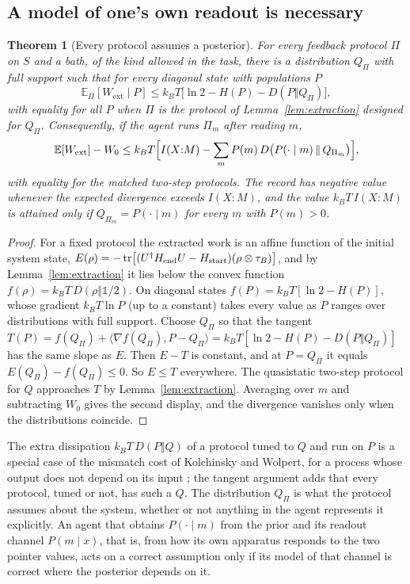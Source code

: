 \documentclass[12pt]{article}
\newtheorem{theorem}{Theorem}
\begin{document}
\subsection{A model of one's own readout is necessary}

\begin{theorem}[Every protocol assumes a posterior]
\label{thm:selfmodel}
For every feedback protocol $\Pi$ on $S$ and a bath, of the kind allowed in the task, there is a distribution $Q_\Pi$ with full support such that for every diagonal state with populations $P$
\[
\mathbb E_\Pi[W_{\mathrm{ext}}\mid P]\le k_BT\bigl[\ln2-H(P)-D(P\Vert Q_\Pi)\bigr],
\]
with equality for all $P$ when $\Pi$ is the protocol of Lemma~\ref{lem:extraction} designed for $Q_\Pi$. Consequently, if the agent runs $\Pi_m$ after reading $m$,
\[
\mathbb E[W_{\mathrm{ext}}]-W_0\le k_BT\Bigl[I(X{:}M)-\sum_mP(m)\,D\bigl(P(\cdot\mid m)\,\Vert\,Q_{\Pi_m}\bigr)\Bigr],
\]
with equality for the matched two-step protocols. The record has negative value whenever the expected divergence exceeds $I(X{:}M)$, and the value $k_BT\,I(X{:}M)$ is attained only if $Q_{\Pi_m}=P(\cdot\mid m)$ for every $m$ with $P(m)>0$.
\end{theorem}

\begin{proof}
For a fixed protocol the extracted work is an affine function of the initial system state, $E(\rho)=-\tr\bigl[(U^\dagger H_{\mathrm{end}}U-H_{\mathrm{start}})(\rho\otimes\tau_B)\bigr]$, and by Lemma~\ref{lem:extraction} it lies below the convex function $f(\rho)=k_BT\,D(\rho\Vert\mathbb 1/2)$. On diagonal states $f(P)=k_BT[\ln2-H(P)]$, whose gradient $k_BT\ln P$ (up to a constant) takes every value as $P$ ranges over distributions with full support. Choose $Q_\Pi$ so that the tangent $T(P)=f(Q_\Pi)+\langle\nabla f(Q_\Pi),P-Q_\Pi\rangle=k_BT[\ln2-H(P)-D(P\Vert Q_\Pi)]$ has the same slope as $E$. Then $E-T$ is constant, and at $P=Q_\Pi$ it equals $E(Q_\Pi)-f(Q_\Pi)\le0$. So $E\le T$ everywhere. The quasistatic two-step protocol for $Q$ approaches $T$ by Lemma~\ref{lem:extraction}. Averaging over $m$ and subtracting $W_0$ gives the second display, and the divergence vanishes only when the distributions coincide.
\end{proof}

The extra dissipation $k_BT\,D(P\Vert Q)$ of a protocol tuned to $Q$ and run on $P$ is a special case of the mismatch cost of Kolchinsky and Wolpert, for a process whose output does not depend on its input \cite{KolchinskyWolpert2017}; the tangent argument adds that every protocol, tuned or not, has such a $Q$. The distribution $Q_\Pi$ is what the protocol assumes about the system, whether or not anything in the agent represents it explicitly. An agent that obtains $P(\cdot\mid m)$ from the prior and its readout channel $P(m\mid x)$, that is, from how its own apparatus responds to the two pointer values, acts on a correct assumption only if its model of that channel is correct where the posterior depends on it.
\end{document}
